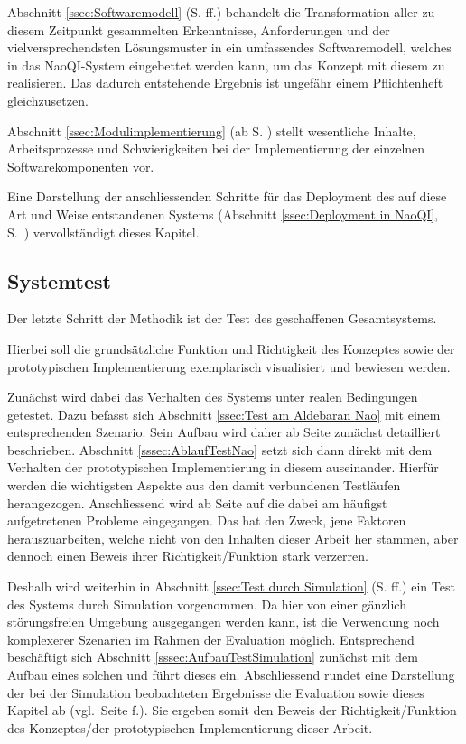 \documentclass[fontsize=11pt,paper=a4,twoside,openright]{scrreprt}
\begin{document}
Abschnitt \ref{ssec:Softwaremodell} (S. \pageref{ssec:Softwaremodell} ff.) behandelt die Transformation aller zu diesem Zeitpunkt gesammelten Erkenntnisse, Anforderungen und der vielversprechendsten Lösungsmuster in ein umfassendes Softwaremodell, welches in das NaoQI-System eingebettet werden kann, um das Konzept mit diesem zu realisieren.
Das dadurch entstehende Ergebnis ist ungefähr einem Pflichtenheft gleichzusetzen.

Abschnitt \ref{ssec:Modulimplementierung} (ab S. \pageref{ssec:Modulimplementierung}) stellt wesentliche Inhalte, Arbeitsprozesse und Schwierigkeiten bei der Implementierung der einzelnen Softwarekomponenten vor.

Eine Darstellung der anschliessenden Schritte für das Deployment des auf diese Art und Weise entstandenen Systems (Abschnitt \ref{ssec:Deployment in NaoQI}, S.\ \pageref{ssec:Deployment in NaoQI}) vervollständigt dieses Kapitel.

\subsection{Systemtest}
\label{sssec:Systemtest}

Der letzte Schritt der Methodik ist der Test des geschaffenen Gesamtsystems.

Hierbei soll die grundsätzliche Funktion und Richtigkeit des Konzeptes sowie der prototypischen Implementierung exemplarisch visualisiert und bewiesen werden.


Zunächst wird dabei das Verhalten des Systems unter realen Bedingungen getestet.
Dazu befasst sich Abschnitt \ref{ssec:Test am Aldebaran Nao} mit einem entsprechenden Szenario.
Sein Aufbau wird daher ab Seite \pageref{sssec:AufbauTestNao} zunächst detailliert beschrieben.
Abschnitt \ref{sssec:AblaufTestNao} setzt sich dann direkt mit dem Verhalten der prototypischen Implementierung in diesem auseinander.
Hierfür werden die wichtigsten Aspekte aus den damit verbundenen Testläufen herangezogen.
Anschliessend wird ab Seite \pageref{sssec:ProblemeTestNao} auf die dabei am häufigst aufgetretenen Probleme eingegangen.
Das hat den Zweck, jene Faktoren herauszuarbeiten, welche nicht von den Inhalten dieser Arbeit her stammen, aber dennoch einen Beweis ihrer Richtigkeit/Funktion stark verzerren.

Deshalb wird weiterhin in Abschnitt \ref{ssec:Test durch Simulation} (S. \pageref{ssec:Test durch Simulation} ff.) ein Test des Systems durch Simulation vorgenommen.
Da hier von einer gänzlich störungsfreien Umgebung ausgegangen werden kann, ist die Verwendung noch komplexerer Szenarien im Rahmen der Evaluation möglich.
Entsprechend beschäftigt sich Abschnitt \ref{sssec:AufbauTestSimulation} zunächst mit dem Aufbau eines solchen und führt dieses ein.
Abschliessend rundet eine Darstellung der bei der Simulation beobachteten Ergebnisse die Evaluation sowie dieses Kapitel ab (vgl.\ Seite \pageref{sssec:AblaufTestSimulation} f.).
Sie ergeben somit den Beweis der Richtigkeit/Funktion des Konzeptes/der prototypischen Implementierung dieser Arbeit. 
\end{document}

